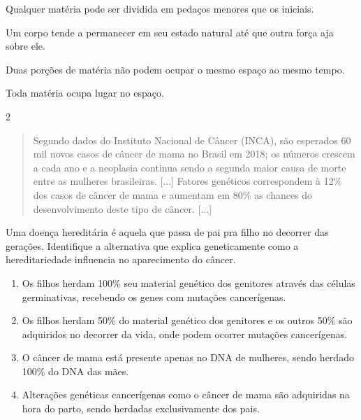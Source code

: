 \begin{escolha}
\item
  Qualquer matéria pode ser dividida em pedaços menores que os iniciais.
\item
  Um corpo tende a permanecer em seu estado natural até que outra força aja sobre ele.
\item
  Duas porções de matéria não podem ocupar o mesmo espaço ao mesmo tempo.
\item
  Toda matéria ocupa lugar no espaço.
\end{escolha}


\num{2}
\begin{quote}
Segundo dados do Instituto Nacional de Câncer (INCA), são esperados
60 mil novos casos de câncer de mama no Brasil em 2018; os números
crescem a cada ano e a neoplasia continua sendo a segunda maior causa
de morte entre as mulheres brasileiras. [...]
Fatores genéticos correspondem
à 12\% dos casos de câncer de mama e aumentam em 80\% as chances do
desenvolvimento deste tipo de câncer. [...]

\end{quote}

Uma doença hereditária é aquela que passa de pai pra filho no decorrer
das gerações. Identifique a alternativa que explica geneticamente como a
hereditariedade influencia no aparecimento do câncer.

\begin{enumerate}
\item
  Os filhos herdam 100\% seu material genético dos genitores através das
  células germinativas, recebendo os genes com mutações cancerígenas.
\item
  Os filhos herdam 50\% do material genético dos genitores e os outros
  50\% são adquiridos no decorrer da vida, onde podem ocorrer mutações
  cancerígenas.
\item
  O câncer de mama está presente apenas no DNA de mulheres, sendo herdado
  100\% do DNA das mães.
\item
  Alterações genéticas cancerígenas como o câncer de mama são adquiridas
  na hora do parto, sendo herdadas exclusivamente dos pais.
\end{enumerate}

